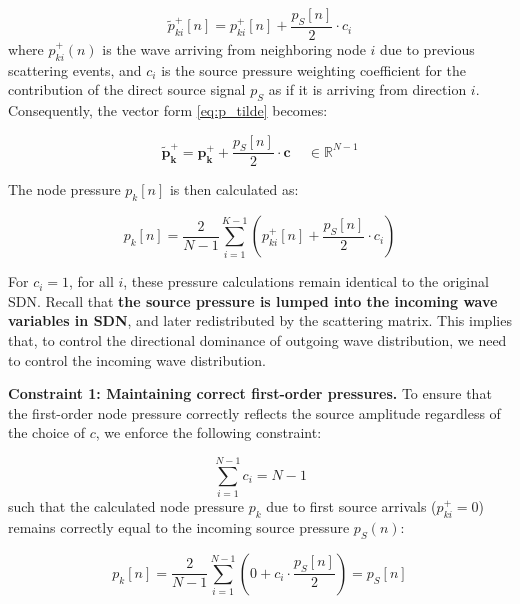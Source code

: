 \documentclass[journal]{IEEEtran}
\begin{document}
\begin{equation}
    \label{eq:incoming_wave_easy}
    \tilde p_{ki}^+[n] = p_{ki}^{+}[n] + \frac{p_{S}[n]}{2} \cdot c_{i}
\end{equation}
%
where \(p_{ki}^{+}(n)\) is the wave arriving from neighboring node \(i\) due to previous scattering events, and \(c_{i}\) is the source pressure weighting coefficient for the contribution of the direct source signal \(p_{S}\) as if it is arriving from direction \(i\). Consequently, the vector form \eqref{eq:p_tilde} becomes:

\begin{equation}
\label{eq:p_tilde_new}
\mathbf{\tilde p_{k}^{+}}
= \mathbf{p_{k}^{+}}
+ \frac{p_{S}[n]}{2}\cdot\mathbf{c}\,\quad \in \mathbb{R}^{N-1}
\end{equation}

The node pressure \(p_k[n]\) is then calculated as:

\begin{equation}
    \label{eq:node_pressure_easy}
    p_k[n] = \frac{2}{N-1} \sum_{i=1}^{K-1} \left(p_{ki}^+[n] + \frac{p_{S}[n]}{2} \cdot c_{i}\right)
\end{equation}

For $c_i = 1$, for all $i$, these pressure calculations remain identical to the original SDN. Recall that \textbf{the source pressure is lumped into the incoming wave variables in SDN}, and later redistributed by the scattering matrix. 
This implies that, to control the directional dominance of outgoing wave distribution, we need to control the incoming wave distribution.

\textbf{Constraint 1: Maintaining correct first-order pressures.}
To ensure that the first-order node pressure correctly reflects the source amplitude regardless of the choice of $c$, we enforce the following constraint:

\begin{equation}
    \label{eq:constraint_ci}
    \sum_{i=1}^{N-1} c_i = N-1
\end{equation}
%
such that the calculated node pressure $p_{k}$ due to first source arrivals ($p_{ki}^{+} = 0$) remains correctly equal to the incoming source pressure $p_{S}(n)$: 

\begin{equation}
    \label{eq:node_pressure_swsdn_first}
    p_k[n] = \frac{2}{N-1} \sum_{i=1}^{N-1} \left( 0 + c_{i} \cdot \frac{p_{S}[n]}{2}\right) = p_{S}[n]
\end{equation}
\end{document}
